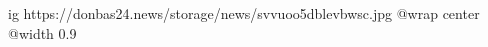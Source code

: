  
 
 
 
 

\ifcmt
  ig https://donbas24.news/storage/news/svvuoo5dblevbwsc.jpg
  @wrap center
  @width 0.9
\fi
